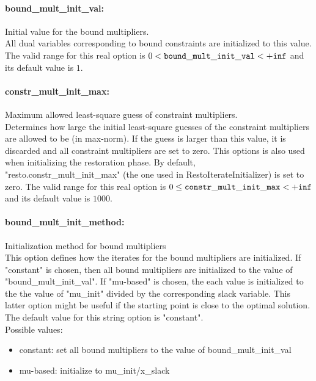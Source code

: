 \paragraph{bound\_mult\_init\_val:}\label{opt:bound_mult_init_val} Initial value for the bound multipliers. \\
 All dual variables corresponding to bound
constraints are initialized to this value. The valid range for this real option is 
$0 <  {\tt bound\_mult\_init\_val } <  {\tt +inf}$
and its default value is $1$.


\paragraph{constr\_mult\_init\_max:}\label{opt:constr_mult_init_max} Maximum allowed least-square guess of constraint multipliers. \\
 Determines how large the initial least-square
guesses of the constraint multipliers are allowed
to be (in max-norm). If the guess is larger than
this value, it is discarded and all constraint
multipliers are set to zero.  This options is
also used when initializing the restoration
phase. By default,
"resto.constr\_mult\_init\_max" (the one used in
RestoIterateInitializer) is set to zero. The valid range for this real option is 
$0 \le {\tt constr\_mult\_init\_max } <  {\tt +inf}$
and its default value is $1000$.


\paragraph{bound\_mult\_init\_method:}\label{opt:bound_mult_init_method} Initialization method for bound multipliers \\
 This option defines how the iterates for the
bound multipliers are initialized.  If "constant"
is chosen, then all bound multipliers are
initialized to the value of
"bound\_mult\_init\_val".  If "mu-based" is
chosen, the each value is initialized to the the
value of "mu\_init" divided by the corresponding
slack variable.  This latter option might be
useful if the starting point is close to the
optimal solution. The default value for this string option is "constant".
\\ 
Possible values:
\begin{itemize}
   \item constant: set all bound multipliers to the value of
bound\_mult\_init\_val
   \item mu-based: initialize to mu\_init/x\_slack
\end{itemize}

